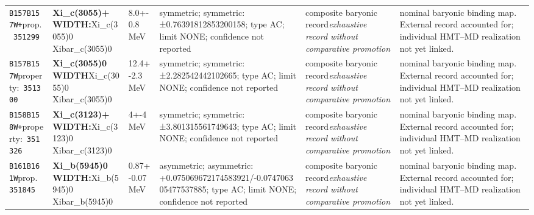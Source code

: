 \begin{landscape}
\begin{longtable}{L{1.85cm}L{4.45cm}L{2.35cm}L{4.05cm}L{3.35cm}L{7.15cm}}
\texttt{B157}\newline \texttt{B157W+}\newline prop.\ \texttt{351299} & \textbf{Xi\_\allowbreak{}c(3055)+ WIDTH:}\newline Xi\_\allowbreak{}c(3055)0 \textbar{}\allowbreak{} Xibar\_\allowbreak{}c(3055)0 & 8.0+-0.8\,MeV & symmetric; symmetric: ±0.76391812853200158; type AC; limit NONE; confidence not reported & composite baryonic record\newline \emph{exhaustive record without comparative promotion} & nominal baryonic binding map. External record accounted for; individual HMT--MD realization not yet linked. \\
\texttt{B157}\newline \texttt{B157W}\newline property:\ \texttt{351300} & \textbf{Xi\_\allowbreak{}c(3055)0 WIDTH}\newline Xi\_\allowbreak{}c(3055)0 \textbar{}\allowbreak{} Xibar\_\allowbreak{}c(3055)0 & 12.4+-2.3\,MeV & symmetric; symmetric: ±2.282542442102665; type AC; limit NONE; confidence not reported & composite baryonic record\newline \emph{exhaustive record without comparative promotion} & nominal baryonic binding map. External record accounted for; individual HMT--MD realization not yet linked. \\
\texttt{B158}\newline \texttt{B158W+}\newline property:\ \texttt{351326} & \textbf{Xi\_\allowbreak{}c(3123)+ WIDTH:}\newline Xi\_\allowbreak{}c(3123)0 \textbar{}\allowbreak{} Xibar\_\allowbreak{}c(3123)0 & 4+-4\,MeV & symmetric; symmetric: ±3.801315561749643; type AC; limit NONE; confidence not reported & composite baryonic record\newline \emph{exhaustive record without comparative promotion} & nominal baryonic binding map. External record accounted for; individual HMT--MD realization not yet linked. \\
\texttt{B161}\newline \texttt{B161W}\newline prop.\ \texttt{351845} & \textbf{Xi\_\allowbreak{}b(5945)0 WIDTH:}\newline Xi\_\allowbreak{}b(5945)0 \textbar{}\allowbreak{} Xibar\_\allowbreak{}b(5945)0 & 0.87+-0.07\,MeV & asymmetric; asymmetric: +0.075069672174583921/-0.074706305477537885; type AC; limit NONE; confidence not reported & composite baryonic record\newline \emph{exhaustive record without comparative promotion} & nominal baryonic binding map. External record accounted for; individual HMT--MD realization not yet linked. \\

\end{longtable}
\end{landscape}
